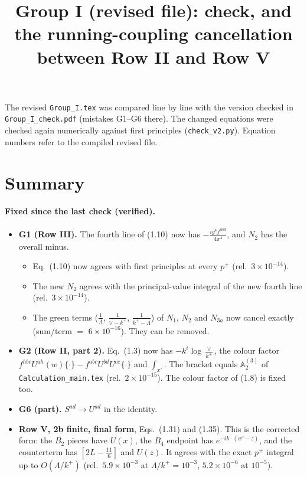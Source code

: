 \documentclass[10pt]{article}
\title{Group I (revised file): check, and the running-coupling cancellation between Row II and Row V}
\date{}
\numberwithin{equation}{section}
\def\mf#1{\mathbb{#1}}
\begin{document}
\maketitle
\noindent The revised \texttt{Group\_I.tex} was compared line by line with the version checked in \texttt{Group\_I\_check.pdf} (mistakes G1--G6 there). The changed equations were checked again numerically against first principles (\texttt{check\_v2.py}). Equation numbers refer to the compiled revised file.

\section{Summary}
\paragraph{Fixed since the last check (verified).}
\begin{itemize}
\item \textbf{G1 (Row III).} The fourth line of (1.10) now has $-\frac{ig^4f^{abd}}{4\pi^4}$, and $N_2$ has the overall minus.
\begin{itemize}
\item Eq.~(1.10) now agrees with first principles at every $p^+$ (rel.\ $3\times10^{-14}$).
\item The new $N_2$ agrees with the principal-value integral of the new fourth line (rel.\ $3\times10^{-14}$).
\item The green terms ($\frac1\Lambda$, $\frac1{\vee-k^+}$, $\frac1{k^+-\Lambda}$) of $N_1$, $N_2$ and $N_{3a}$ now cancel exactly (sum/term $=$ $6\times10^{-16}$). They can be removed.
\end{itemize}
\item \textbf{G2 (Row II, part 2).} Eq.~(1.3) now has $-k^i\log\frac{\vee}{k^+}$, the colour factor $f^{hbc}U^{ah}(w)\{\cdot\}-f^{abc}U^{bd}U^{ce}\{\cdot\}$ and $\int_{x'}$. The bracket equals $\mf A^{(3)}_2$ of \texttt{Calculation\_main.tex} (rel.\ $2\times10^{-15}$). The colour factor of (1.8) is fixed too.
\item \textbf{G6 (part).} $S^{ad}\to U^{ad}$ in the identity.
\item \textbf{Row V, 2b finite, final form}, Eqs.~(1.31) and (1.35). This is the corrected form: the $B_2$ pieces have $U(x)$, the $B_4$ endpoint has $e^{-ik\cdot(w'-z)}$, and the counterterm has $[2L-\frac{11}{6}]$ and $U(z)$. It agrees with the exact $p^+$ integral up to $O(\Lambda/k^+)$ (rel.\ $5.9\times10^{-3}$ at $\Lambda/k^+=10^{-3}$, $5.2\times10^{-6}$ at $10^{-5}$).
\end{itemize}
\end{document}
